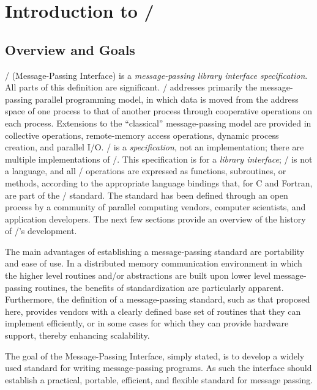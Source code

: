 
\chapter{Introduction to \texorpdfstring{\MPI/}{MPI}}
\label{sec:intro}
\label{chap:intro}
\label{sec:intro-2}
\label{chap:intro-2}

\section{Overview and Goals}
\MPI/ (Message-Passing Interface) is a \emph{message-passing library
  interface specification}.  All parts of this definition are
significant.  \MPI/ addresses primarily the message-passing parallel
programming model, in which data is moved from the address space of
one process to that of another process through cooperative operations
on each process.  Extensions to the ``classical'' message-passing model
are provided in collective operations, remote-memory access
operations, dynamic process creation, and parallel I/O.  \MPI/ is a
\emph{specification}, not an implementation; there are multiple
implementations of \MPI/.  This specification is for a \emph{library
  interface}; \MPI/ is not a language, and all \MPI/ operations are
expressed as functions, subroutines, or methods, according to the
appropriate language bindings
that, for C and Fortran, are part of the \MPI/ standard.  The standard has been
defined through an open process by a community of parallel computing
vendors, computer scientists, and application developers.  The next
few sections provide an overview of the history of \MPI/'s development.

The main advantages of establishing a message-passing standard are portability
and ease of use. In a distributed memory communication environment in which
the higher level routines and/or abstractions are
built
upon lower level
message-passing routines, the benefits of standardization are particularly
apparent. Furthermore, the definition of a message-passing standard, such
as that proposed here, provides vendors with a clearly defined base set of
routines that they can implement efficiently, or in some cases for which they can provide hardware support, thereby enhancing scalability.

The goal of the Message-Passing Interface, simply stated, is to
develop a widely used
standard for writing message-passing programs.
As such the interface should
establish a practical, portable, efficient, and flexible standard for message
passing.

